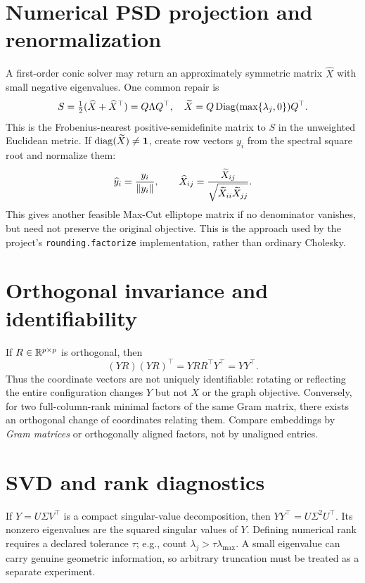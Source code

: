 \section{Numerical PSD projection and renormalization}
A first-order conic solver may return an approximately symmetric matrix $\widehat X$ with small negative eigenvalues. One common repair is
\[
S=\tfrac12(\widehat X+\widehat X^\top)=Q\Lambda Q^\top,\quad
\widetilde X=Q\operatorname{Diag}(\max\{\lambda_j,0\})Q^\top.
\]
This is the Frobenius-nearest positive-semidefinite matrix to $S$ in the unweighted Euclidean metric. If $\operatorname{diag}(\widetilde X)\ne\boldsymbol{1}$, create row vectors $y_i$ from the spectral square root and normalize them:
\[
\widehat y_i=\frac{y_i}{\left\lVert y_i\right\rVert},\qquad
\widehat X_{ij}=\frac{\widetilde X_{ij}}{\sqrt{\widetilde X_{ii}\widetilde X_{jj}}}.
\]
This gives another feasible Max-Cut elliptope matrix if no denominator vanishes, but need not preserve the original objective. This is the approach used by the project's \texttt{rounding.factorize} implementation, rather than ordinary Cholesky.

\section{Orthogonal invariance and identifiability}
If $R\in\mathbb{R}^{p\times p}$ is orthogonal, then
\[
(YR)(YR)^\top=YRR^\top Y^\top=YY^\top.
\]
Thus the coordinate vectors are not uniquely identifiable: rotating or reflecting the entire configuration changes $Y$ but not $X$ or the graph objective. Conversely, for two full-column-rank minimal factors of the same Gram matrix, there exists an orthogonal change of coordinates relating them. Compare embeddings by \emph{Gram matrices} or orthogonally aligned factors, not by unaligned entries.

\section{SVD and rank diagnostics}
If $Y=U\Sigma V^\top$ is a compact singular-value decomposition, then $YY^\top=U\Sigma^2U^\top$. Its nonzero eigenvalues are the squared singular values of $Y$. Defining numerical rank requires a declared tolerance $\tau$; e.g., count $\lambda_j>\tau\lambda_{\max}$. A small eigenvalue can carry genuine geometric information, so arbitrary truncation must be treated as a separate experiment.
